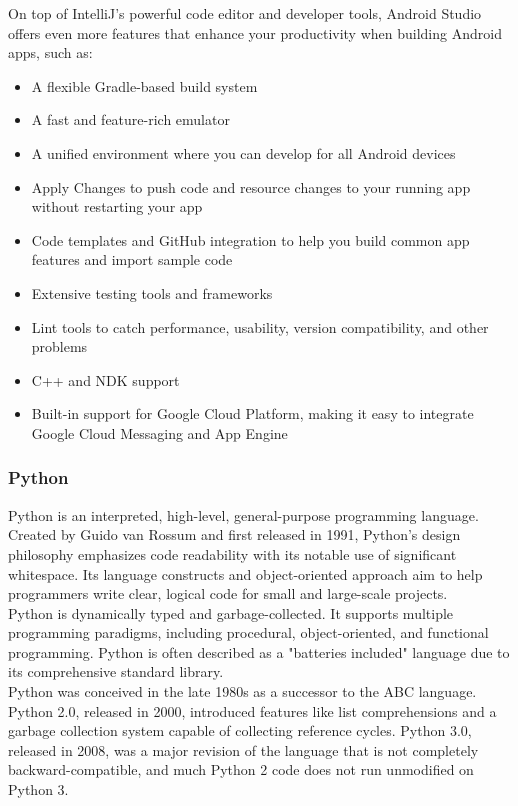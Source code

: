 \documentclass[14pt]{report}
\begin{document}
				On top of IntelliJ's powerful code editor and developer tools, Android Studio offers even more features that enhance your productivity when building Android apps, such as:
					\begin{itemize}
						\item A flexible Gradle-based build system
						\item A fast and feature-rich emulator
						\item A unified environment where you can develop for all Android devices
						\item Apply Changes to push code and resource changes to your running app without restarting your app
						\item Code templates and GitHub integration to help you build common app features and import sample code
						\item Extensive testing tools and frameworks
						\item Lint tools to catch performance, usability, version compatibility, and other problems
						\item C++ and NDK support
						\item Built-in support for Google Cloud Platform, making it easy to integrate Google Cloud Messaging and App Engine
					\end{itemize}
				\subsubsection{Python}
					Python is an interpreted, high-level, general-purpose programming language. Created by Guido van Rossum and first released in 1991, Python's design philosophy emphasizes code readability with its notable use of significant whitespace. Its language constructs and object-oriented approach aim to help programmers write clear, logical code for small and large-scale projects.\\

					Python is dynamically typed and garbage-collected. It supports multiple programming paradigms, including procedural, object-oriented, and functional programming. Python is often described as a "batteries included" language due to its comprehensive standard library.\\

					Python was conceived in the late 1980s as a successor to the ABC language. Python 2.0, released in 2000, introduced features like list comprehensions and a garbage collection system capable of collecting reference cycles. Python 3.0, released in 2008, was a major revision of the language that is not completely backward-compatible, and much Python 2 code does not run unmodified on Python 3.\\
\end{document}
